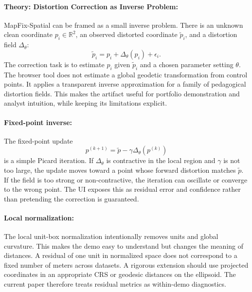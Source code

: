 \documentclass{article}
\begin{document}
\paragraph{Theory: Distortion Correction as Inverse Problem:}

MapFix-Spatial can be framed as a small inverse problem. There is an unknown clean coordinate $p_i\in\mathbb{R}^2$, an observed distorted coordinate $\tilde{p}_i$, and a distortion field $\Delta_{\theta}$:
\begin{equation}
  \tilde{p}_i = p_i + \Delta_{\theta}(p_i) + \epsilon_i.
\end{equation}
The correction task is to estimate $p_i$ given $\tilde{p}_i$ and a chosen parameter setting $\theta$. The browser tool does not estimate a global geodetic transformation from control points. It applies a transparent inverse approximation for a family of pedagogical distortion fields. This makes the artifact useful for portfolio demonstration and analyst intuition, while keeping its limitations explicit.

\paragraph{Fixed-point inverse:}

The fixed-point update
\begin{equation}
  p^{(k+1)}=\tilde{p}-\gamma\Delta_{\theta}(p^{(k)})
\end{equation}
is a simple Picard iteration. If $\Delta_{\theta}$ is contractive in the local region and $\gamma$ is not too large, the update moves toward a point whose forward distortion matches $\tilde{p}$. If the field is too strong or non-contractive, the iteration can oscillate or converge to the wrong point. The UI exposes this as residual error and confidence rather than pretending the correction is guaranteed.

\paragraph{Local normalization:}

The local unit-box normalization intentionally removes units and global curvature. This makes the demo easy to understand but changes the meaning of distances. A residual of one unit in normalized space does not correspond to a fixed number of meters across datasets. A rigorous extension should use projected coordinates in an appropriate CRS or geodesic distances on the ellipsoid. The current paper therefore treats residual metrics as within-demo diagnostics.
\end{document}
